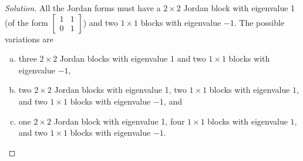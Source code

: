 \documentclass[11pt]{amsart}
\begin{document}
\begin{enumerate}[(1)]
\begin{proof}[Solution]
All the Jordan forms must have a $2 \times 2$ Jordan block with eigenvalue 1 (of the form $\begin{bmatrix} 1&1\\ 0&1 \end{bmatrix}$) and two $1 \times 1$ blocks with eigenvalue $-1$.
The possible variations are
\begin{enumerate}[(a)]
\item three $2 \times 2$ Jordan blocks with eigenvalue 1 and two $1 \times 1$ blocks with eigenvalue $-1$,
\item two $2 \times 2$ Jordan blocks with eigenvalue 1, two $1 \times 1$ blocks with eigenvalue $1$, and two $1 \times 1$ blocks with eigenvalue $-1$, and
\item one $2 \times 2$ Jordan block with eigenvalue 1, four $1 \times 1$ blocks with eigenvalue $1$, and two $1 \times 1$ blocks with eigenvalue $-1$. \qedhere
\end{enumerate}
\end{proof}

\end{enumerate}
\end{document}
